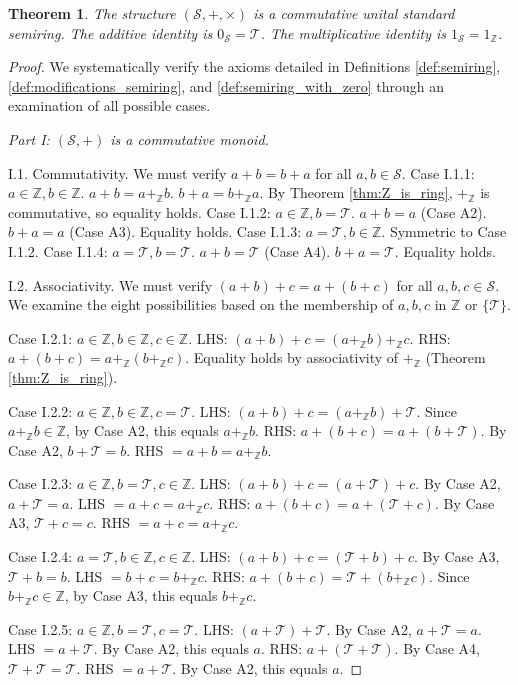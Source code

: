 \documentclass[11pt, a4paper]{article}
\theoremstyle{plain}
\newtheorem{theorem}{Theorem}[section]
\theoremstyle{definition}
\numberwithin{equation}{section}
\newcommand{\Z}{\mathbb{Z}}
\newcommand{\Tobj}{\mathcal{T}} %
\newcommand{\SemiringS}{\mathcal{S}}
\begin{document}
\begin{theorem}\label{thm:S_is_semiring}
The structure $(\SemiringS, +, \times)$ is a commutative unital standard semiring. The additive identity is $0_{\SemiringS}=\Tobj$. The multiplicative identity is $1_{\SemiringS}=1_{\Z}$.
\end{theorem}
\begin{proof}
We systematically verify the axioms detailed in Definitions \ref{def:semiring}, \ref{def:modifications_semiring}, and \ref{def:semiring_with_zero} through an examination of all possible cases.

\emph{Part I: $(\SemiringS, +)$ is a commutative monoid.}

I.1. Commutativity. We must verify $a+b = b+a$ for all $a, b \in \SemiringS$.
Case I.1.1: $a \in \Z, b \in \Z$. $a+b = a+_{\Z} b$. $b+a = b+_{\Z} a$. By Theorem \ref{thm:Z_is_ring}, $+_{\Z}$ is commutative, so equality holds.
Case I.1.2: $a \in \Z, b=\Tobj$. $a+b = a$ (Case A2). $b+a = a$ (Case A3). Equality holds.
Case I.1.3: $a=\Tobj, b \in \Z$. Symmetric to Case I.1.2.
Case I.1.4: $a=\Tobj, b=\Tobj$. $a+b = \Tobj$ (Case A4). $b+a = \Tobj$. Equality holds.

I.2. Associativity. We must verify $(a+b)+c = a+(b+c)$ for all $a, b, c \in \SemiringS$. We examine the eight possibilities based on the membership of $a, b, c$ in $\Z$ or $\{\Tobj\}$.

Case I.2.1: $a \in \Z, b \in \Z, c \in \Z$.
LHS: $(a+b)+c = (a+_{\Z} b)+_{\Z} c$. RHS: $a+(b+c) = a+_{\Z} (b+_{\Z} c)$. Equality holds by associativity of $+_{\Z}$ (Theorem \ref{thm:Z_is_ring}).

Case I.2.2: $a \in \Z, b \in \Z, c=\Tobj$.
LHS: $(a+b)+c = (a+_{\Z} b)+\Tobj$. Since $a+_{\Z} b \in \Z$, by Case A2, this equals $a+_{\Z} b$.
RHS: $a+(b+c) = a+(b+\Tobj)$. By Case A2, $b+\Tobj=b$. RHS $= a+b = a+_{\Z} b$.

Case I.2.3: $a \in \Z, b=\Tobj, c \in \Z$.
LHS: $(a+b)+c = (a+\Tobj)+c$. By Case A2, $a+\Tobj=a$. LHS $= a+c = a+_{\Z} c$.
RHS: $a+(b+c) = a+(\Tobj+c)$. By Case A3, $\Tobj+c=c$. RHS $= a+c = a+_{\Z} c$.

Case I.2.4: $a=\Tobj, b \in \Z, c \in \Z$.
LHS: $(a+b)+c = (\Tobj+b)+c$. By Case A3, $\Tobj+b=b$. LHS $= b+c = b+_{\Z} c$.
RHS: $a+(b+c) = \Tobj+(b+_{\Z} c)$. Since $b+_{\Z} c \in \Z$, by Case A3, this equals $b+_{\Z} c$.

Case I.2.5: $a \in \Z, b=\Tobj, c=\Tobj$.
LHS: $(a+\Tobj)+\Tobj$. By Case A2, $a+\Tobj=a$. LHS $= a+\Tobj$. By Case A2, this equals $a$.
RHS: $a+(\Tobj+\Tobj)$. By Case A4, $\Tobj+\Tobj=\Tobj$. RHS $= a+\Tobj$. By Case A2, this equals $a$.


\end{proof}
\end{document}
